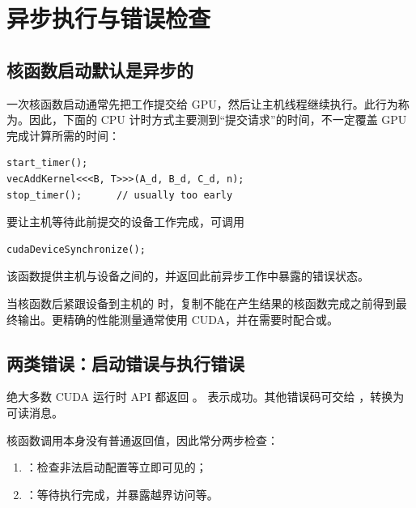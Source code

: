 \section{异步执行与错误检查}

\subsection{核函数启动默认是异步的}

\par\noindent\begin{minipage}{\linewidth}
一次核函数启动通常先把工作提交给 GPU，然后让主机线程继续执行。此行为称为。因此，下面的 CPU 计时方式主要测到“提交请求”的时间，不一定覆盖 GPU 完成计算所需的时间：

\begin{lstlisting}[style=cuda,numbers=none]
start_timer();
vecAddKernel<<<B, T>>>(A_d, B_d, C_d, n);
stop_timer();      // usually too early
\end{lstlisting}
\end{minipage}\par

\par\noindent\begin{minipage}{\linewidth}
要让主机等待此前提交的设备工作完成，可调用
\begin{lstlisting}[style=cuda,numbers=none]
cudaDeviceSynchronize();
\end{lstlisting}
\end{minipage}\par
该函数提供主机与设备之间的，并返回此前异步工作中暴露的错误状态。


当核函数后紧跟设备到主机的  时，复制不能在产生结果的核函数完成之前得到最终输出。更精确的性能测量通常使用 CUDA，并在需要时配合或。

\subsection{两类错误：启动错误与执行错误}

绝大多数 CUDA 运行时 API 都返回 。 表示成功。其他错误码可交给 ，转换为可读消息。

核函数调用本身没有普通返回值，因此常分两步检查：
\begin{enumerate}
  \item {}：检查非法启动配置等立即可见的；
  \item {}：等待执行完成，并暴露越界访问等。
\end{enumerate}

